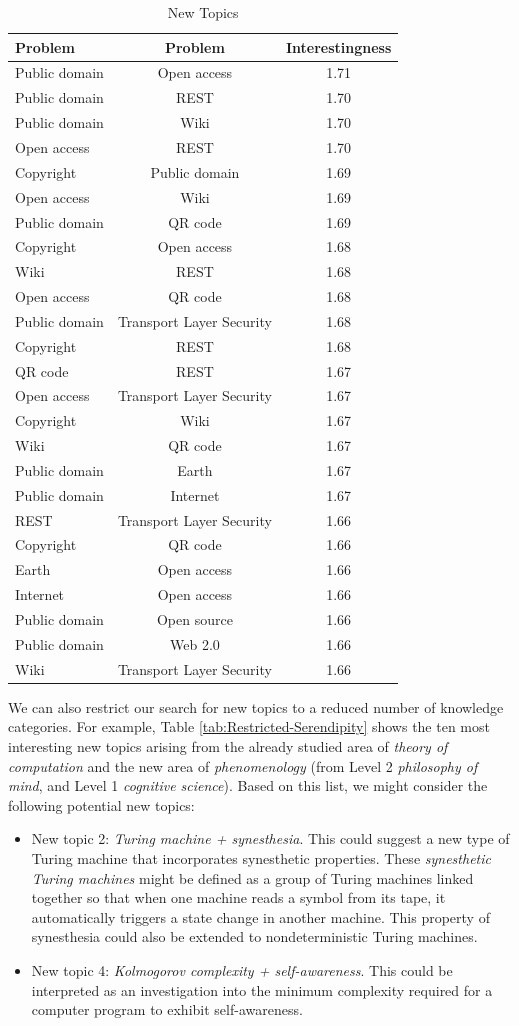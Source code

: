 \begin{table}
\begin{centering}
\begin{tabular}{|l|c|c|}
\hline 
{Problem} & Problem & Interestingness\tabularnewline
\hline 
\hline 
Public domain & Open access & 1.71\tabularnewline
\hline 
{Public domain} & REST & 1.70\tabularnewline
\hline 
Public domain & Wiki & 1.70\tabularnewline
\hline 
Open access & REST & 1.70\tabularnewline
\hline 
Copyright & Public domain & 1.69\tabularnewline
\hline 
Open access & Wiki & 1.69\tabularnewline
\hline 
Public domain & QR code & 1.69\tabularnewline
\hline 
Copyright & Open access & 1.68\tabularnewline
\hline 
Wiki & REST & 1.68\tabularnewline
\hline 
Open access & QR code & 1.68\tabularnewline
\hline 
Public domain & Transport Layer Security & 1.68\tabularnewline
\hline 
Copyright & REST & 1.68\tabularnewline
\hline 
QR code & REST & 1.67\tabularnewline
\hline 
Open access & Transport Layer Security & 1.67\tabularnewline
\hline 
Copyright & Wiki & 1.67\tabularnewline
\hline 
Wiki & QR code & 1.67\tabularnewline
\hline 
Public domain & Earth & 1.67\tabularnewline
\hline 
Public domain & Internet & 1.67\tabularnewline
\hline 
REST & Transport Layer Security & 1.66\tabularnewline
\hline 
Copyright & QR code & 1.66\tabularnewline
\hline 
Earth & Open access & 1.66\tabularnewline
\hline 
Internet & Open access & 1.66\tabularnewline
\hline 
Public domain & Open source & 1.66\tabularnewline
\hline 
Public domain & Web 2.0 & 1.66\tabularnewline
\hline 
Wiki & Transport Layer Security & 1.66\tabularnewline
\hline 
\end{tabular}
\par\end{centering}

\caption{\label{tab:Serendipity-Topics}New Topics}
\end{table}

We can also restrict our search for new topics to a reduced number of knowledge categories. For example, Table \ref{tab:Restricted-Serendipity} shows the ten most interesting new topics arising from the already studied area of \emph{theory of computation} and the new area of \emph{phenomenology} (from Level 2 \emph{philosophy of mind}, and Level 1 \emph{cognitive science}). Based on this list, we might consider the following potential new topics:

\begin{itemize}
\item New topic 2: \emph{Turing machine + synesthesia}. This could suggest a new type of Turing machine that incorporates synesthetic properties. These \emph{synesthetic Turing machines} might be defined as a group of Turing machines linked together so that when one machine reads a symbol from its tape, it automatically triggers a state change in another machine. This property of synesthesia could also be extended to nondeterministic Turing machines.
\item New topic 4: \emph{Kolmogorov complexity + self-awareness}. This could be interpreted as an investigation into the minimum complexity required for a computer program to exhibit self-awareness.
\end{itemize}

